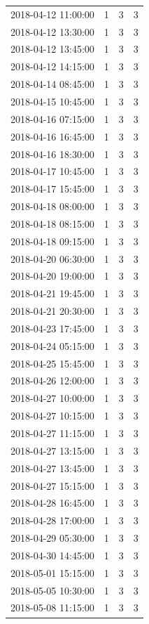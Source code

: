 \begin{tabular}{lrrr}
2018-04-12 11:00:00 & 1 & 3 & 3 \\
2018-04-12 13:30:00 & 1 & 3 & 3 \\
2018-04-12 13:45:00 & 1 & 3 & 3 \\
2018-04-12 14:15:00 & 1 & 3 & 3 \\
2018-04-14 08:45:00 & 1 & 3 & 3 \\
2018-04-15 10:45:00 & 1 & 3 & 3 \\
2018-04-16 07:15:00 & 1 & 3 & 3 \\
2018-04-16 16:45:00 & 1 & 3 & 3 \\
2018-04-16 18:30:00 & 1 & 3 & 3 \\
2018-04-17 10:45:00 & 1 & 3 & 3 \\
2018-04-17 15:45:00 & 1 & 3 & 3 \\
2018-04-18 08:00:00 & 1 & 3 & 3 \\
2018-04-18 08:15:00 & 1 & 3 & 3 \\
2018-04-18 09:15:00 & 1 & 3 & 3 \\
2018-04-20 06:30:00 & 1 & 3 & 3 \\
2018-04-20 19:00:00 & 1 & 3 & 3 \\
2018-04-21 19:45:00 & 1 & 3 & 3 \\
2018-04-21 20:30:00 & 1 & 3 & 3 \\
2018-04-23 17:45:00 & 1 & 3 & 3 \\
2018-04-24 05:15:00 & 1 & 3 & 3 \\
2018-04-25 15:45:00 & 1 & 3 & 3 \\
2018-04-26 12:00:00 & 1 & 3 & 3 \\
2018-04-27 10:00:00 & 1 & 3 & 3 \\
2018-04-27 10:15:00 & 1 & 3 & 3 \\
2018-04-27 11:15:00 & 1 & 3 & 3 \\
2018-04-27 13:15:00 & 1 & 3 & 3 \\
2018-04-27 13:45:00 & 1 & 3 & 3 \\
2018-04-27 15:15:00 & 1 & 3 & 3 \\
2018-04-28 16:45:00 & 1 & 3 & 3 \\
2018-04-28 17:00:00 & 1 & 3 & 3 \\
2018-04-29 05:30:00 & 1 & 3 & 3 \\
2018-04-30 14:45:00 & 1 & 3 & 3 \\
2018-05-01 15:15:00 & 1 & 3 & 3 \\
2018-05-05 10:30:00 & 1 & 3 & 3 \\
2018-05-08 11:15:00 & 1 & 3 & 3 \\

\end{tabular}
